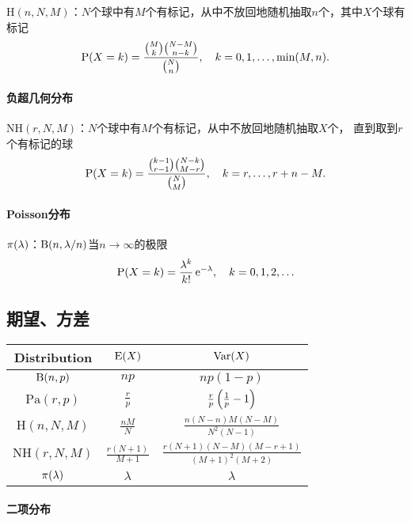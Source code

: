 $\mathrm H(n,N,M)$：$N$个球中有$M$个有标记，从中不放回地随机抽取$n$个，其中$X$个球有标记
\begin{equation}
	\P(X=k)=\frac{\binom Mk\binom{N-M}{n-k}}{\binom N n},\quad k=0,1,\ldots,\min(M,n).
\end{equation}

\paragraph{负超几何分布}

$\mathrm{NH}(r,N,M)$：$N$个球中有$M$个有标记，从中不放回地随机抽取$X$个，
直到取到$r$个有标记的球
\begin{equation}
	\P(X=k)=\frac{\binom{k-1}{r-1}\binom{N-k}{M-r}}{\binom N M},\quad k=r,\ldots,r+n-M.
\end{equation}

\paragraph{Poisson分布}

$\Pois(\lambda)$：$\Bino(n,\lambda/n)$当$n\to\infty$的极限
\begin{equation}
	\P(X=k)=\frac{\lambda^k}{k!}\e{-\lambda},\quad k=0,1,2,\ldots
\end{equation}

\subsection{期望、方差}

\begin{center}
	\begin{tabular}{ccc}
		\toprule
		Distribution&$\E(X)$&$\Var(X)$\\
		\midrule
		$\Bino(n,p)$&$np$&$np(1-p)$\\[1ex]
		$\mathrm{Pa}(r,p)$&$\frac rp$&$\frac rp\kh{\frac1p-1}$\\[2ex]
		$\mathrm H(n,N,M)$&$\frac{nM}N$&$\frac{n(N-n)M(N-M)}{N^2(N-1)}$\\[2ex]
		$\mathrm{NH}(r,N,M)$&$\frac{r(N+1)}{M+1}$&$\frac{r(N+1)(N-M)(M-r+1)}{(M+1)^2(M+2)}$\\
		$\Pois(\lambda)$&$\lambda$&$\lambda$\\
		\bottomrule
	\end{tabular}
\end{center}

\paragraph{二项分布}

